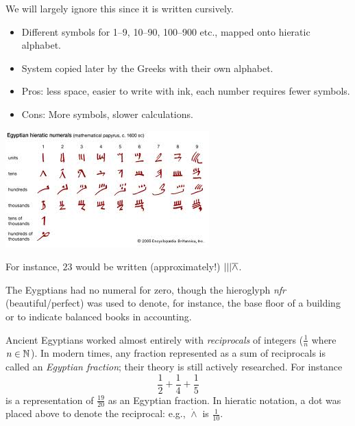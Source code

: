 \begin{minipage}[t]{0.5\linewidth}\vspace{0pt}
	
	We will largely ignore this since it is written cursively.
	\begin{itemize}\itemsep0pt
	  \item Different symbols for 1--9, 10--90, 100--900 etc., mapped onto hieratic alphabet.
	  \item System copied later by the Greeks with their own alphabet.
	  \item Pros: less space, easier to write with ink, each number requires fewer symbols.
		\item Cons: More symbols, slower calculations.
	\end{itemize}
\end{minipage}
\hfill
\begin{minipage}[t]{0.49\linewidth}\vspace{0pt}
	\flushright
	\includegraphics[scale=0.75]{hieratic.jpg}
\end{minipage}
\medbreak

For instance, $23$ would be written (approximately!) $|||\overline{\wedge}$.\smallbreak

The Eygptians had no numeral for zero, though the hieroglyph \emph{nfr} (beautiful/perfect) was used to denote, for instance, the base floor of a building or to indicate balanced books in accounting.
\vspace{-5pt}



Ancient Egyptians worked almost entirely with \emph{reciprocals} of integers ($\frac 1n$ where $n\in\mathbb{N}$). In modern times, any fraction represented as a sum of reciprocals is called an \emph{Egyptian fraction}; their theory is still actively researched. For instance
\[
	\frac 12+\frac 14+\frac 15
\]
is a representation of $\frac{19}{20}$ as an Egyptian fraction.\smallbreak
In hieratic notation, a dot was placed above to denote the reciprocal: e.g., $\dot{\wedge}$ is $\frac 1{10}$.\par

